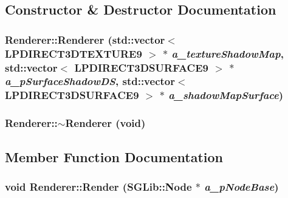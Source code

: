 \subsection{Constructor \& Destructor Documentation}
\hypertarget{class_renderer_a9988ec7dfd7fb3c9c3920576264dbc88}{
\subsubsection[{Renderer}]{\setlength{\rightskip}{0pt plus 5cm}Renderer::Renderer (std::vector$<$ LPDIRECT3DTEXTURE9 $>$ $\ast$ {\em a\_\-textureShadowMap}, \/  std::vector$<$ LPDIRECT3DSURFACE9 $>$ $\ast$ {\em a\_\-pSurfaceShadowDS}, \/  std::vector$<$ LPDIRECT3DSURFACE9 $>$ $\ast$ {\em a\_\-shadowMapSurface})}}
\label{class_renderer_a9988ec7dfd7fb3c9c3920576264dbc88}
\hypertarget{class_renderer_a99308d3d72cd9408dd8faa2136dec547}{
\subsubsection[{$\sim$Renderer}]{\setlength{\rightskip}{0pt plus 5cm}Renderer::$\sim$Renderer (void)}}
\label{class_renderer_a99308d3d72cd9408dd8faa2136dec547}


\subsection{Member Function Documentation}
\hypertarget{class_renderer_ac97416b1b1a1ac05343affadd0a82f5a}{
\subsubsection[{Render}]{\setlength{\rightskip}{0pt plus 5cm}void Renderer::Render (SGLib::Node $\ast$ {\em a\_\-pNodeBase})}}
\label{class_renderer_ac97416b1b1a1ac05343affadd0a82f5a}


